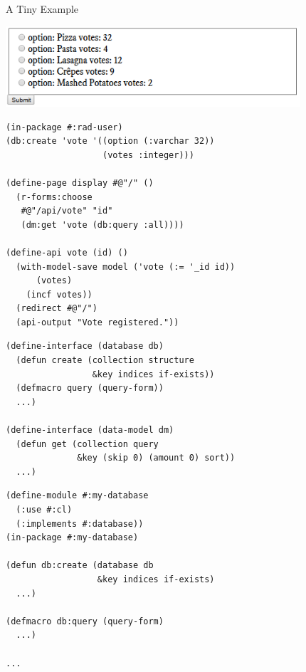 \documentclass[12pt]{beamer}
\newcommand{\toptitle}[1]{
  {\huge #1} \\
  \vspace{0.2cm}
}
\begin{document}
\begin{frame}
  \toptitle{A Tiny Example}
  \includegraphics[height=3cm]{voter.png}
\end{frame}

\begin{frame}[fragile]
  \begin{verbatim}
(in-package #:rad-user)
(db:create 'vote '((option (:varchar 32))
                   (votes :integer)))

(define-page display #@"/" ()
  (r-forms:choose 
   #@"/api/vote" "id"
   (dm:get 'vote (db:query :all))))

(define-api vote (id) ()
  (with-model-save model ('vote (:= '_id id))
      (votes)
    (incf votes))
  (redirect #@"/")
  (api-output "Vote registered."))
  \end{verbatim}
\end{frame}

\begin{frame}[fragile]
  \begin{verbatim}
(define-interface (database db)
  (defun create (collection structure 
                 &key indices if-exists))
  (defmacro query (query-form))
  ...)

(define-interface (data-model dm)
  (defun get (collection query 
              &key (skip 0) (amount 0) sort))
  ...)
  \end{verbatim}
\end{frame}

\begin{frame}[fragile]
  \begin{verbatim}
(define-module #:my-database
  (:use #:cl)
  (:implements #:database))
(in-package #:my-database)

(defun db:create (database db
                  &key indices if-exists)
  ...)

(defmacro db:query (query-form)
  ...)

...
  \end{verbatim}
\end{frame}
\end{document}
